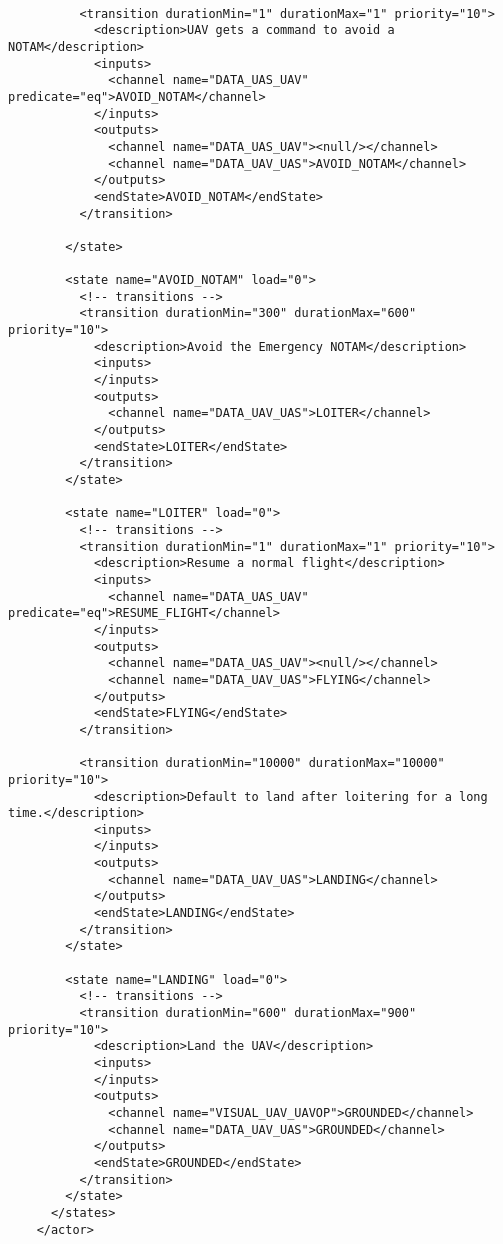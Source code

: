 \begin{verbatim}
          
          <transition durationMin="1" durationMax="1" priority="10">
            <description>UAV gets a command to avoid a NOTAM</description>
            <inputs>
              <channel name="DATA_UAS_UAV" predicate="eq">AVOID_NOTAM</channel>
            </inputs>
            <outputs>
              <channel name="DATA_UAS_UAV"><null/></channel>
              <channel name="DATA_UAV_UAS">AVOID_NOTAM</channel>
            </outputs>
            <endState>AVOID_NOTAM</endState>
          </transition>
          
        </state>
        
        <state name="AVOID_NOTAM" load="0">
          <!-- transitions -->
          <transition durationMin="300" durationMax="600" priority="10">
            <description>Avoid the Emergency NOTAM</description>
            <inputs>
            </inputs>
            <outputs>
              <channel name="DATA_UAV_UAS">LOITER</channel>
            </outputs>
            <endState>LOITER</endState>
          </transition>
        </state>
        
        <state name="LOITER" load="0">
          <!-- transitions -->
          <transition durationMin="1" durationMax="1" priority="10">
            <description>Resume a normal flight</description>
            <inputs>
              <channel name="DATA_UAS_UAV" predicate="eq">RESUME_FLIGHT</channel>
            </inputs>
            <outputs>
              <channel name="DATA_UAS_UAV"><null/></channel>
              <channel name="DATA_UAV_UAS">FLYING</channel>
            </outputs>
            <endState>FLYING</endState>
          </transition>
          
          <transition durationMin="10000" durationMax="10000" priority="10">
            <description>Default to land after loitering for a long time.</description>
            <inputs>
            </inputs>
            <outputs>
              <channel name="DATA_UAV_UAS">LANDING</channel>
            </outputs>
            <endState>LANDING</endState>
          </transition>
        </state>
        
        <state name="LANDING" load="0">
          <!-- transitions -->
          <transition durationMin="600" durationMax="900" priority="10">
            <description>Land the UAV</description>
            <inputs>
            </inputs>
            <outputs>
              <channel name="VISUAL_UAV_UAVOP">GROUNDED</channel>
              <channel name="DATA_UAV_UAS">GROUNDED</channel>
            </outputs>
            <endState>GROUNDED</endState>
          </transition>
        </state>
      </states>
    </actor>
\end{verbatim}
